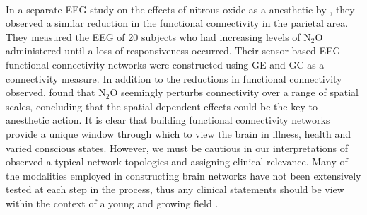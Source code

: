 \documentclass[11pt]{article}
\begin{document}
\\
In a separate EEG study on the effects of nitrous oxide as a anesthetic by \citet{kuhl}, they observed a similar reduction in the functional connectivity in the parietal area. They measured the EEG of 20 subjects who had increasing levels of N$_2$O administered until a loss of responsiveness occurred. Their sensor based EEG functional connectivity networks were constructed using GE and GC as a connectivity measure. In addition to the reductions in functional connectivity observed, \citet{kuhl} found that  N$_2$O seemingly perturbs connectivity over a range of spatial scales, concluding that the spatial dependent effects could be the key to anesthetic action. It is clear that building functional connectivity networks provide a unique window through which to view the brain in illness, health and varied conscious states. However, we must be cautious in our interpretations of observed a-typical network topologies and assigning clinical relevance. Many of the modalities employed in constructing brain networks have not been extensively tested at each step in the process, thus any clinical statements should be view within the context of a young and growing field \citep{fornito2013graph, friston}.
\end{document}
